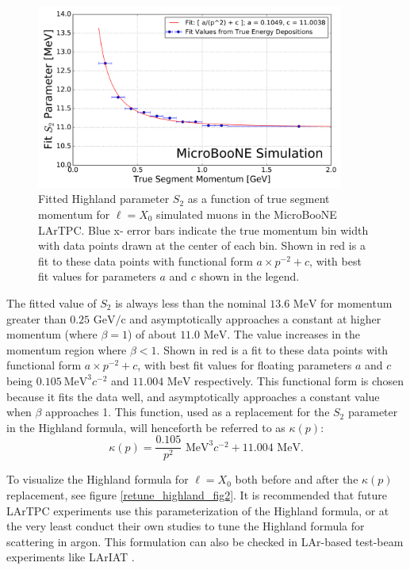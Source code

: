 \documentclass[a4paper,11pt]{article}
\begin{document}
\begin{figure}[ht!]
\begin{center}
\includegraphics[width=0.9\textwidth]{Figures/highland_constant_optimization_momentumdependent.png}
\end{center}
\caption{Fitted Highland parameter $S_2$ as a function of true segment momentum for ${\ell} = X_0$ simulated muons in the MicroBooNE LArTPC. Blue x- error bars indicate the true momentum bin width with data points drawn at the center of each bin. Shown in red is a fit to these data points with functional form $a\times p^{-2} + c$, with best fit values for parameters $a$ and $c$ shown in the legend.}
\label{retune_highland_fig1}
\end{figure}

The fitted value of $S_2$ is always less than the nominal $13.6\text{ MeV}$ for momentum greater than $0.25\text{ GeV/c}$ and asymptotically approaches a constant at higher momentum (where $\beta = 1$) of about $11.0\text{ MeV}$. The value increases in the momentum region where $\beta < 1$. Shown in red is a fit to these data points with functional form $a\times p^{-2} + c$, with best fit values for floating parameters $a$ and $c$ being $0.105~\text{MeV}^3c^{-2}$ and $11.004\text{ MeV}$ respectively. This functional form is chosen because it fits the data well, and asymptotically approaches a constant value when $\beta$ approaches 1. This function, used as a replacement for the $S_2$ parameter in the Highland formula, will henceforth be referred to as $\kappa(p)$:
\begin{equation}\label{kappa_equation}
\kappa(p) = \frac{0.105}{p^2}\text{ MeV}^3c^{-2} + 11.004\text{ MeV}.
\end{equation}

To visualize the Highland formula for ${\ell} = X_0$ both before and after the $\kappa(p)$ replacement, see figure \ref{retune_highland_fig2}. It is recommended that future LArTPC experiments use this parameterization of the Highland formula, or at the very least conduct their own studies to tune the Highland formula for scattering in argon. This formulation can also be checked in LAr-based test-beam experiments like LArIAT \cite{LARIAT_citation}.\\
\end{document}
